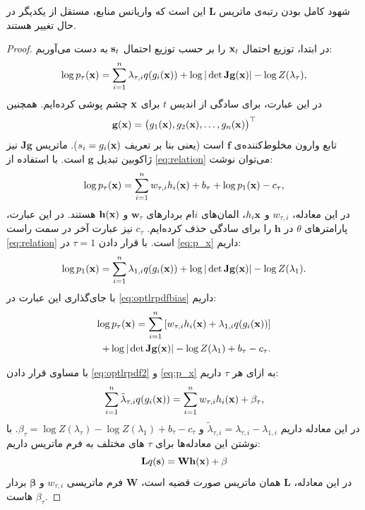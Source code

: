 \begin{note}
شهود کامل بودن رتبه‌ی ماتریس 
$\mathbf{L}$
این است که واریانس منابع، مستقل از یکدیگر در حال تغییر هستند.
\end{note}
\begin{proof}
در ابتدا، توزیع احتمال 
$\mathbf{x}_t$
را بر حسب توزیع احتمال
$\mathbf{s}_t$
به دست می‌آوریم:
\begin{equation}
\log p_\tau(\mathbf{x}) = \sum_{i=1}^n \lambda_{\tau,i}q(g_i(\mathbf{x})) 
+ \log | \det  \mathbf{J} \mathbf{g} (\mathbf{x}) | - \log Z(\lambda_\tau),
\label{eq:p_x}
\end{equation}
در این عبارت، برای سادگی از اندیس 
$t$ 
برای
$\mathbf{x}$
چشم پوشی کرده‌ایم. همچنین
\begin{equation}
\mathbf{g}(\mathbf{x}) = \big(g_1(\mathbf{x}), g_2(\mathbf{x}), \dots, g_n(\mathbf{x})\big)^\top
\end{equation}
تابع وارون مخلوط‌کننده‌ی
$\mathbf{f}$
است (یعنی بنا بر تعریف
$s_i = g_i(\mathbf{x})$).
ماتریس 
$\mathbf{Jg}$
نیز ژاکوبین تبدیل 
$\mathbf{g}$
است. با استفاده از 
\eqref{eq:relation}
می‌توان نوشت:
\begin{equation} 
\log p_\tau(\mathbf{x})= \sum_{i=1}^n w_{\tau,i} h_i(\mathbf{x}) + b_\tau + \log p_1(\mathbf{x}) - c_\tau,
\label{eq:optlrpdfbias}
\end{equation}
در این معادله، 
$w_{\tau, i}$
و
$h_i{\mathbf{x}}$،
المان‌های 
$i$ام
بردار‌های 
$\mathbf{w}_\tau$
و
$\mathbf{h}(\mathbf{x})$
هستند. در این عبارت، پارامتر‌های
$\theta$
در 
$\mathbf{h}$
را برای سادگی حذف کرده‌ایم. 
$c_\tau$
نیز عبارت آخر در سمت راست
\eqref{eq:relation}
است. با قرار دادن 
$\tau = 1$
در 
\eqref{eq:p_x}
داریم:
\begin{equation}
\log p_1(\mathbf{x})= \sum_{i=1}^n \lambda_{1,i} q(g_i(\mathbf{x})) + \log |\det \mathbf{ J g}(\mathbf{x})| - \log Z(\lambda_1).
\label{eq:p1_x}
\end{equation} 
با جای‌گذاری این عبارت در 
\eqref{eq:optlrpdfbias}
داریم:
\begin{align} \label{eq:optlrpdf2}
\log p_\tau(\mathbf{x}) = \sum_{i=1}^n \left[w_{\tau,i} h_i(\mathbf{x}) + \lambda_{1,i} q(g_i(\mathbf{x})) \right] \\
+ \log |\det\mathbf{ J g}(\mathbf{x})| - \log Z(\lambda_1)  + b_\tau - c_\tau.
\end{align}

با مساوی قرار دادن 
\eqref{eq:optlrpdf2}
و
\eqref{eq:p_x}
به ازای هر 
$\tau$
داریم:
\begin{equation}
\sum_{i=1}^n \tilde{\lambda}_{\tau,i} q(g_i(\mathbf{x})) 
= \sum_{i=1}^n w_{\tau,i} h_i(\mathbf{x}) + \beta_\tau,
\label{eq:maineq}
\end{equation}
در این معادله داریم
$\tilde{\lambda}_{\tau,i}= \lambda_{\tau,i}- \lambda_{1,i}$ 
و
 $\beta_\tau= \log Z(\lambda_\tau)-\log Z(\lambda_1)+b_\tau-c_\tau$.
با نوشتن این معادله‌ها برای 
$\tau$
های مختلف  به فرم ماتریس داریم:
\begin{equation}
\mathbf{ L} q(\s) %
= \mathbf{W} \h(\x) + \mathbf{\beta}
\end{equation}
در این معادله،
$\mathbf{ L}$
همان ماتریس صورت قضیه است،
$\mathbf{ W}$
فرم ماتریسی
$w_{\tau, i}$
و
$\mathbf{\beta}$
بردار 
$\beta_\tau$
هاست.


\end{proof}
